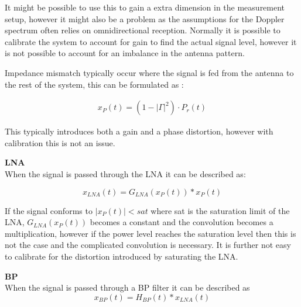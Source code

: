It might be possible to use this to gain a extra dimension in the measurement setup, however it might also be a problem as the assumptions for the Doppler spectrum often relies on omnidirectional reception. Normally it is possible to calibrate the system to account for gain to find the actual signal level, however it is not possible to account for an imbalance in the antenna pattern. 


Impedance mismatch typically occur where the signal is fed from the antenna to the rest of the system, this can be formulated as \citep[p. 63]{balanis}:

\begin{align}
x_P(t) = (1-|\Gamma|^2)\cdot P_r(t) \label{eq:ref_power}
\end{align}
\begin{where}
\end{where}

This typically introduces both a gain and a phase distortion, however with calibration this is not an issue.

\textbf{\Gls{LNA}}\\
When the signal is passed through the LNA it can be described as:

\begin{equation}
x_{LNA}(t) = G_{LNA}\left(x_P(t)\right)*x_P(t)
\end{equation}
\begin{where}
\end{where}

If the signal conforms to $|x_P(t)| < sat$ where sat is the saturation limit of the LNA, $G_{LNA}\left(x_P(t)\right)$ becomes a constant and the convolution becomes a multiplication, however if the power level reaches the saturation level then this is not the case and the complicated convolution is necessary. It is further not easy to calibrate for the distortion introduced by saturating the LNA.


\textbf{\Gls{BP}}\\
When the signal is passed through a BP filter it can be described as
\begin{equation}
x_{BP}(t) = H_{BP}(t)*x_{LNA}(t)
\end{equation}
\begin{where}
\end{where}

